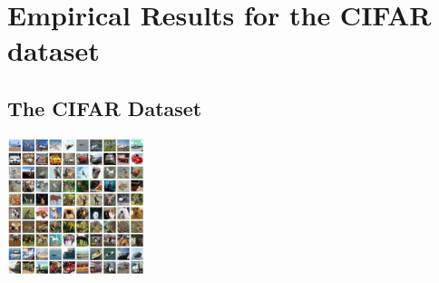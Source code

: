 \documentclass[a4paper]{scrartcl}
\begin{document}
\section{Empirical Results for the CIFAR dataset}

\subsection{The CIFAR Dataset}
\begin{center}
\includegraphics[width=4cm]{images/cifar-10.png}
\end{center} 
\end{document}
